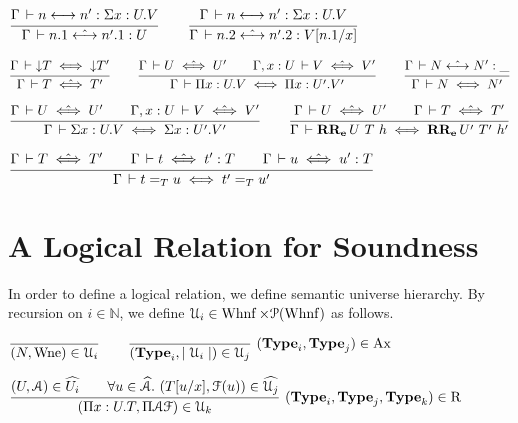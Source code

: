 \documentclass[a4paper,english]{lipics-utf8x}
\begin{document}
  \begin{center}
  \(
    \ru{\Gamma \der n \steq n' : \Sigma x:U.V
      }{\Gamma \der n.1 \hsteq n'.1 : U}
    \qquad
    \ru{\Gamma \der n \steq n' : \Sigma x:U.V
      }{\Gamma \der n.2 \hsteq n'.2 : V[n.1/x]}
  \)
  \end{center}


  \begin{center}
  \(
    \ru{\Gamma \der \red T \iff \red T'
      }{\Gamma \der T \hiff T'}
    \qquad
    \ru{\Gamma \der U \hiff U' \qquad
        \Gamma, x:U \der V \hiff V'
      }{\Gamma \der \Pi x:U.V \iff \Pi x:U'.V'}
    \qquad
    \ru{\Gamma \der N \hsteq N' : \_
      }{\Gamma \der N \iff N'}
  \)
  \end{center}

  \begin{center}
  \(
    \ru{\Gamma \der U \hiff U' \qquad
        \Gamma, x:U \der V \hiff V'
      }{\Gamma \der \Sigma x:U.V \iff \Sigma x:U'.V'}
    \qquad
    \ru{\Gamma \der U \hiff U' \qquad
        \Gamma \der T \hiff T'
      }{\Gamma \der \RRe{U}{T}{h} \iff \RRe{U'}{T'}{h'}}
  \)
  \end{center}

  \begin{center}
  \(
    \ru{\Gamma \der T \hiff T' \qquad
        \Gamma \der t \hiff t' : T \qquad
        \Gamma \der u \hiff u' : T
      }{\Gamma \der t =_T u \iff t' =_T u'}
  \)
  \end{center}

  \section{A Logical Relation for Soundness}


  In order to define a logical relation, we define semantic universe hierarchy.
  By recursion on $i \in \mathbb{N}$, we define
  $\mathcal{U}_i \in \operatorname{Whnf} \times \mathcal{P}(\operatorname{Whnf})$ as follows.

  \begin{center}
  \(
    \ru{}{(N, \Wne) \in \U_i}
    \qquad
    \rux{}{(\Type_i, \mid \U_i \mid) \in \U_j}{(\Type_i,\Type_j) \in \Ax}
  \)
  \end{center}

  \begin{center}
  \(
    \rux{(U, \mathcal{A}) \in \widehat{U_i} \qquad
         \forall u \in \widehat{\mathcal{A}}.\ (T[u/x],\mathcal{F}(u)) \in
         \widehat{\U_j}
       }{(\Pi x:U.T, \Pi \mathcal{A} \mathcal{F}) \in \U_k
       }{(\Type_i, \Type_j, \Type_k) \in \R}
  \)
  \end{center}
\end{document}

